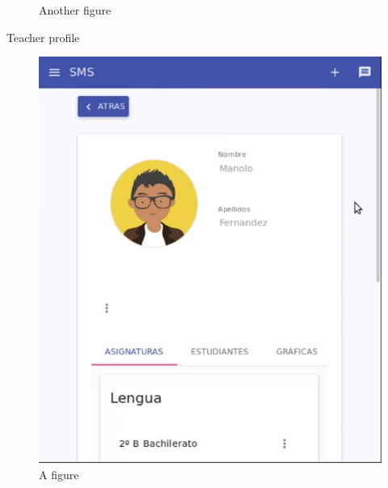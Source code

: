 \begin{figure}[H]
\begin{minipage}{.5\textwidth}
  \caption{Another figure}
\end{minipage}
\end{figure}

\noindent Teacher profile

\begin{figure}[H]
\centering
\begin{minipage}{.5\textwidth}
  \centering
  \includegraphics[scale=0.3]{img/snaps/teacher_profile.png}
  \caption{A figure}
\end{minipage}%
\begin{minipage}{.5\textwidth}
  \centering

\end{minipage}
\end{figure}
